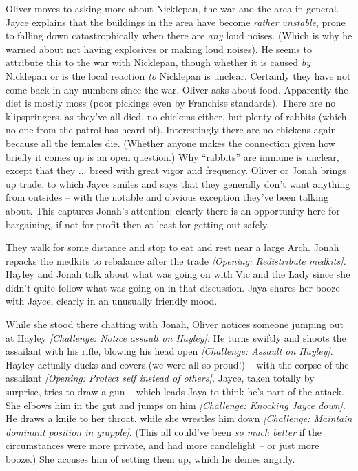 Oliver moves to asking more about Nicklepan, the war and the area in general.  Jayce explains that the buildings in the area have become\textit{ rather unstable}, prone to falling down catastrophically when there are\textit{ any} loud noises.  (Which is why he warned about not having explosives or making loud noises).  He seems to attribute this to the war with Nicklepan, though whether it is caused\textit{ by} Nicklepan or is the local reaction\textit{ to} Nicklepan is unclear.  Certainly they have not come back in any numbers since the war.  Oliver asks about food.  Apparently the diet is mostly moss (poor pickings even by Franchise standards).  There are no klipspringers, as they've all died, no chickens either, but plenty of rabbits (which no one from the patrol has heard of).  Interestingly there are no chickens again because all the females die.  (Whether anyone makes the connection given how briefly it comes up is an open question.)  Why ``rabbits'' are immune is unclear, except that they ... breed with great vigor and frequency.   Oliver or Jonah brings up trade, to which Jayce smiles and says that they generally don't want anything from outsides – with the notable and obvious exception they've been talking about.  This captures Jonah's attention: clearly there is an opportunity here for bargaining, if not for profit then at least for getting out safely.



They walk for some distance and stop to eat and rest near a large Arch.  Jonah repacks the medkits to rebalance after the trade\textit{ {[}Opening: Redistribute medkits{]}.}  Hayley and Jonah talk about what was going on with Vic and the Lady since she didn't quite follow what was going on in that discussion.   Jaya shares her booze with Jayce, clearly in an unusually friendly mood.



While she stood there chatting with Jonah, Oliver notices someone jumping out at Hayley\textit{ {[}Challenge: Notice assault on Hayley{]}}.  He turns swiftly and shoots the assailant with his rifle, blowing his head open\textit{ {[}Challenge: Assault on Hayley{]}}.  Hayley actually ducks and covers (we were all so proud!) – with the corpse of the assailant\textit{ {[}Opening: Protect self instead of others{]}.}  Jayce, taken totally by surprise, tries to draw a gun – which leads Jaya to think he's part of the attack.  She elbows him in the gut and jumps on him\textit{ {[}Challenge: Knocking Jayce down{]}}.  He draws a knife to her throat, while she wrestles him down\textit{ {[}Challenge: Maintain dominant position in grapple{]}}.  (This all could've been\textit{ so much better} if the circumstances were more private, and had more candlelight – or just more booze.)  She accuses him of setting them up, which he denies angrily.



